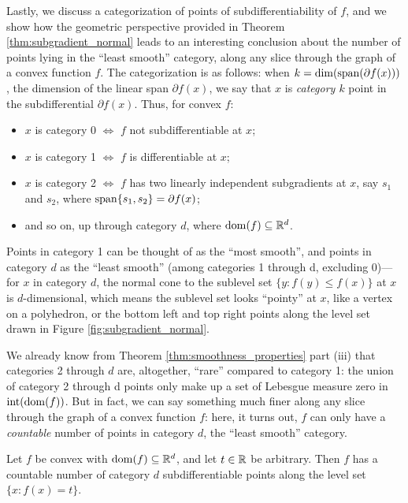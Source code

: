 Lastly, we discuss a categorization of points of subdifferentiability of $f$,
and we show how the geometric perspective provided in Theorem
\ref{thm:subgradient_normal} leads to an interesting conclusion about the number 
of points lying in the ``least smooth'' category, along any slice through the
graph of a convex function $f$. The categorization is as follows: when $k =
\operatorname{dim}(\operatorname{span}(\partial f(x)))$, the dimension of the linear span $\partial f(x)$, we
say that $x$ is \emph{category $k$} point in the subdifferential $\partial
f(x)$. Thus, for convex $f$:  
\begin{itemize}
\item $x$ is category 0 $\iff$ $f$ not subdifferentiable at $x$;
\item $x$ is category 1 $\iff$ $f$ is differentiable at $x$;
\item $x$ is category 2 $\iff$ $f$ has two linearly independent subgradients at 
  $x$, say $s_1$ and $s_2$, where $\operatorname{span}\{s_1, s_2\} = \partial f(x)$; 
\item and so on, up through category $d$, where $\operatorname{dom}(f) \subseteq \mathbb{R}^d$. 
\end{itemize}
Points in category 1 can be thought of as the ``most smooth'', and points in
category $d$ as the ``least smooth'' (among categories 1 through d, excluding
0)---for $x$ in category $d$, the normal cone to the sublevel set $\{y : f(y)
\leq f(x)\}$ at $x$ is $d$-dimensional, which means the sublevel set looks
``pointy'' at $x$, like a vertex on a polyhedron, or the bottom left and top
right points along the level set drawn in Figure \ref{fig:subgradient_normal}. 

We already know from Theorem \ref{thm:smoothness_properties} part (iii) that
categories 2 through $d$ are, altogether, ``rare'' compared to category 1: the
union of category 2 through d points only make up a set of Lebesgue measure
zero in $\operatorname{int}(\operatorname{dom}(f))$. But in fact, we can say something much finer along
any slice through the graph of a convex function $f$: here, it turns out, $f$
can only have a \emph{countable} number of points in category $d$, the ``least
smooth'' category. 

\begin{Theorem}
\label{thm:subgradient_category_d}
Let $f$ be convex with $\operatorname{dom}(f) \subseteq \mathbb{R}^d$, and let $t \in \mathbb{R}$ be
arbitrary.  Then $f$ has a countable number of category $d$ subdifferentiable
points along the level set $\{x : f(x) = t\}$. 
\end{Theorem}

